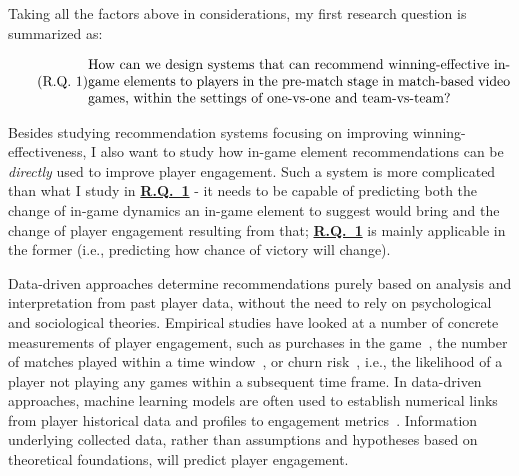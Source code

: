 Taking all the factors above in considerations, my first research question is summarized as: 

\begin{equation}
  \tag{R.Q. 1}\label{rq1}
  \parbox{\dimexpr\linewidth-4em}{%
    \strut
    How can we design systems that can recommend winning-effective in-game elements to players in the pre-match stage in match-based video games, within the settings of one-vs-one and team-vs-team?
    \strut
  }
\end{equation}




Besides studying recommendation systems focusing on improving winning-effectiveness, I also want to study how in-game element recommendations can be \textit{directly} used to improve player engagement. Such a system is more complicated than what I study in \hyperref[rq1]{\textbf{R.Q.~1}} - it needs to be capable of predicting both the change of in-game dynamics an in-game element to suggest would bring and the change of player engagement resulting from that; \hyperref[rq1]{\textbf{R.Q.~1}} is mainly applicable in the former (i.e., predicting how chance of victory will change). 

Data-driven approaches determine recommendations purely based on analysis and interpretation from past player data, without the need to rely on psychological and sociological theories. Empirical studies have looked at a number of concrete measurements of player engagement, such as purchases in the game~\cite{xie2015predicting,sifa2015predicting}, the number of matches played within a time window~\cite{xue2017dynamic,weber2011modeling,}, or churn risk~\cite{hadiji2014predicting,harrison2012players}, i.e., the likelihood of a player not playing any games within a subsequent time frame. In data-driven approaches, machine learning models are often used to establish numerical links from player historical data and profiles to engagement metrics~\cite{yannakakis2013player}. Information underlying collected data, rather than assumptions and hypotheses based on theoretical foundations, will predict player engagement.


